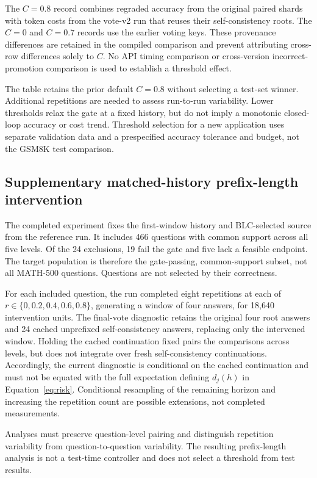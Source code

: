 The $C=0.8$ record combines regraded accuracy from the original paired shards with token costs from the vote-v2 run that reuses their self-consistency roots. The $C=0$ and $C=0.7$ records use the earlier voting keys. These provenance differences are retained in the compiled comparison and prevent attributing cross-row differences solely to $C$. No API timing comparison or cross-version incorrect-promotion comparison is used to establish a threshold effect.

The table retains the prior default $C=0.8$ without selecting a test-set winner. Additional repetitions are needed to assess run-to-run variability. Lower thresholds relax the gate at a fixed history, but do not imply a monotonic closed-loop accuracy or cost trend. Threshold selection for a new application uses separate validation data and a prespecified accuracy tolerance and budget, not the GSM8K test comparison.

\subsection{Supplementary matched-history prefix-length intervention}
\label{app:length_intervention}
The completed experiment fixes the first-window history and BLC-selected source from the reference run. It includes 466 questions with common support across all five levels. Of the 24 exclusions, 19 fail the gate and five lack a feasible endpoint. The target population is therefore the gate-passing, common-support subset, not all MATH-500 questions. Questions are not selected by their correctness.

For each included question, the run completed eight repetitions at each of $r\in\{0,0.2,0.4,0.6,0.8\}$, generating a window of four answers, for 18,640 intervention units. The final-vote diagnostic retains the original four root answers and 24 cached unprefixed self-consistency answers, replacing only the intervened window. Holding the cached continuation fixed pairs the comparisons across levels, but does not integrate over fresh self-consistency continuations. Accordingly, the current diagnostic is conditional on the cached continuation and must not be equated with the full expectation defining $d_j(h)$ in Equation~\ref{eq:risk}. Conditional resampling of the remaining horizon and increasing the repetition count are possible extensions, not completed measurements.

Analyses must preserve question-level pairing and distinguish repetition variability from question-to-question variability. The resulting prefix-length analysis is not a test-time controller and does not select a threshold from test results.

